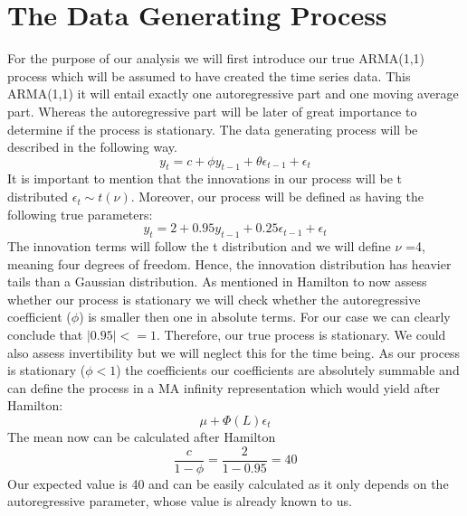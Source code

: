 \documentclass[a4paper,12pt]{article}
\begin{document}
\section{The Data Generating Process}
For the purpose of our analysis we will first introduce our true ARMA(1,1) process which will be assumed to have created the time series data.
This ARMA(1,1) it will entail exactly one autoregressive part and one moving average part. Whereas the autoregressive part will be later of great importance to determine if the process is stationary.
The data generating process will be described in the following way.
\begin{equation}
    y_t = c + \phi y_{t-1} + \theta \epsilon_{t-1} + \epsilon_t
\end{equation}
It is important to mention that the innovations in our process will be t distributed $\epsilon_t \sim t(\nu) $. Moreover, our process will be defined as having the following true parameters:
\begin{equation}
    y_t = 2 + 0.95y_{t-1} + 0.25\epsilon_{t-1} + \epsilon_t
\end{equation}
The innovation terms will follow the t distribution and we will define $\nu$ =4, meaning four degrees of freedom. Hence, the innovation distribution has heavier tails than a Gaussian distribution.
As mentioned in Hamilton to now assess whether our process is stationary we will check whether the autoregressive coefficient ($\phi$) is smaller then one in absolute terms.
For our case we can clearly conclude that $|0.95| <= 1$. 
Therefore, our true process is stationary. We could also assess invertibility but we will neglect this for the time being.
As our process is stationary ($\phi<1$) the coefficients our coefficients are absolutely summable and can define the process in a MA infinity representation which would yield after Hamilton:
\begin{equation}
    \mu + \Phi(L)\epsilon_t
\end{equation}
The mean now can be calculated after Hamilton
\begin{equation}
\frac{c}{1-\phi} = \frac{2}{1-0.95} = 40
\end{equation}
Our expected value is 40 and can be easily calculated as it only depends on the autoregressive parameter, whose value is already known to us.
\end{document}
